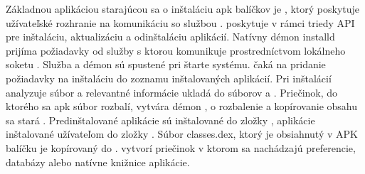 \noindent Základnou aplikáciou starajúcou sa o inštaláciu apk balíčkov je , ktorý poskytuje užívateľské rozhranie na komunikáciu so službou .   poskytuje v rámci triedy  API pre inštaláciu, aktualizáciu a odinštaláciu aplikácií. Natívny démon installd prijíma požiadavky od služby  s ktorou komunikuje prostredníctvom lokálneho soketu . Služba  a démon  sú spustené pri štarte systému.  čaká na pridanie požiadavky na inštaláciu do zoznamu inštalovaných aplikácií. Pri inštalácií analyzuje súbor  a relevantné informácie ukladá do súborov  a . Priečinok, do ktorého sa apk súbor rozbalí, vytvára démon , o rozbalenie a kopírovanie obsahu sa stará . Predinštalované aplikácie sú inštalované do zložky , aplikácie inštalované užívateľom do zložky . Súbor classes.dex, ktorý je obsiahnutý v APK balíčku je kopírovaný do .  vytvorí priečinok  v ktorom sa nachádzajú preferencie, databázy alebo natívne knižnice aplikácie.


